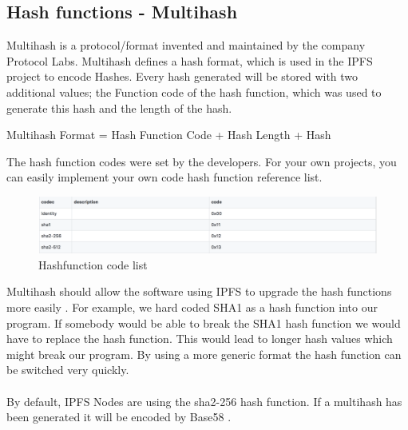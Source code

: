 \documentclass[a4paper,11pt, oneside]{report}
\theoremstyle{definition}
\begin{document}
\subsection{Hash functions - Multihash}
Multihash is a protocol/format  invented and maintained by the company Protocol Labs. Multihash defines a hash format, which is used in the IPFS project to encode Hashes. Every hash generated will be stored with two additional values; the Function code of the  hash function, which was used to generate this hash and the length of the hash.
\begin{center}
	Multihash Format = Hash Function Code + Hash Length + Hash
\end{center}
The hash function codes were set by the developers. For your own projects, you can easily implement your own code hash function reference list.\\[0.3cm]
\begin{figure}[H]
\centering
\includegraphics[width=\textwidth]{img/multiformat_hashfunctionid.png}
\caption[Hashfunction code list]{Hashfunction code list}
\end{figure}
\noindent
Multihash should allow the software using IPFS to upgrade the hash functions more easily \cite{multihash}. For example, we hard coded SHA1 as a hash function into our program. If somebody would be able to break the SHA1 hash function we would have to replace the hash function. This would lead to longer hash values which might break our program. By using a more generic format the hash function can be switched very quickly.\\ \\
By default, IPFS Nodes are using the sha2-256 hash function. If a multihash has been generated it will be encoded by Base58 \cite{Encoding}.
\end{document}
